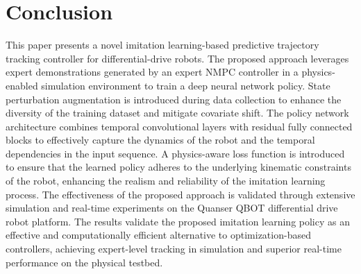 \documentclass[letterpaper, 10 pt, conference]{ieeeconf}
\begin{document}
\section{Conclusion}
This paper presents a novel imitation learning-based predictive trajectory tracking controller for differential-drive robots. The proposed approach leverages expert demonstrations generated by an expert NMPC controller in a physics-enabled simulation environment to train a deep neural network policy. State perturbation augmentation is introduced during data collection to enhance the diversity of the training dataset and mitigate covariate shift.
The policy network architecture combines temporal convolutional layers with residual fully connected blocks to effectively capture the dynamics of the robot and the temporal dependencies in the input sequence. A physics-aware loss function is introduced to ensure that the learned policy adheres to the underlying kinematic constraints of the robot, enhancing the realism and reliability of the imitation learning process.
The effectiveness of the proposed approach is validated through extensive simulation and real-time experiments on the Quanser QBOT differential drive robot platform.
The results validate the proposed imitation learning policy as an effective and computationally efficient alternative to optimization-based controllers, achieving expert-level tracking in simulation and superior real-time performance on the physical testbed.

\balance


\end{document}
